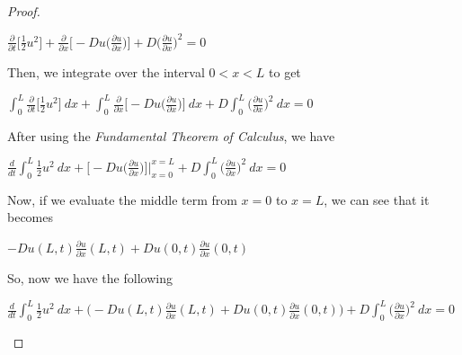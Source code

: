 \documentclass[12pt, executivepaper]{article}
\begin{document}
\begin{flushleft}
\begin{proof}
\begin{center}

$\frac{\partial}{\partial t} \bigg[\frac{1}{2} u^2\bigg] + \frac{\partial}{\partial x} \bigg[-Du \bigg(\frac{\partial u}{\partial x}\bigg) \bigg] + D \bigg(\frac{\partial u}{\partial x}\bigg)^2=0$

\end{center}

Then, we integrate over the interval $0 < x < L$ to get

\begin{center}

$\int_{0}^{L} \frac{\partial}{\partial t} \bigg[\frac{1}{2} u^2\bigg] \ dx + \int_{0}^{L} \frac{\partial}{\partial x} \bigg[-Du \bigg(\frac{\partial u}{\partial x}\bigg)\bigg] \ dx + D \int_{0}^{L} \bigg(\frac{\partial u}{\partial x}\bigg)^2 \ dx=0$

\end{center}

After using the \textit{Fundamental Theorem of Calculus}, we have

\begin{center}

$\frac{d}{dt}\int_{0}^{L} \frac{1}{2} u^2 \ dx + \bigg[-Du \bigg(\frac{\partial u}{\partial x}\bigg)\bigg] \Big|_{x=0}^{x=L}+ D \int_{0}^{L} \bigg(\frac{\partial u}{\partial x}\bigg)^2 \ dx=0$

\end{center}

Now, if we evaluate the middle term from $x=0$ to $x=L$, we can see that it becomes

\begin{center}

$-Du(L,t) \frac{\partial u}{\partial x}(L,t) + Du(0,t) \frac{\partial u}{\partial x}(0,t)$

\end{center}

\pagebreak

\vspace*{-40mm}

So, now we have the following

\begin{center}

$\frac{d}{dt}\int_{0}^{L} \frac{1}{2} u^2 \ dx + \bigg(-Du(L,t) \frac{\partial u}{\partial x}(L,t) + Du(0,t) \frac{\partial u}{\partial x}(0,t)\bigg)+ D \int_{0}^{L} \bigg(\frac{\partial u}{\partial x}\bigg)^2 \ dx=0$

\end{center}


\end{proof}
\end{flushleft}
\end{document}

